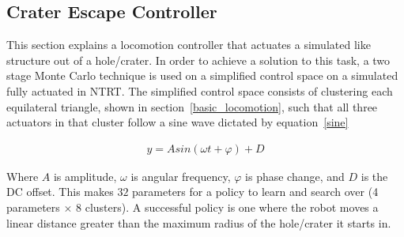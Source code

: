 
\subsection{Crater Escape Controller}
\label{sec:crater}
This section explains a locomotion controller that actuates a simulated \SB{} like structure out of a hole/crater.
In order to achieve a solution to this task, a two stage Monte Carlo technique is used on a simplified control space on a simulated fully actuated \SB{} in NTRT.
The simplified control space consists of clustering each equilateral triangle, shown in section~\ref{basic_locomotion}, such that all three actuators in that cluster follow a sine wave dictated by equation~\ref{sine}

\begin{align}
y = Asin(\omega t + \varphi) + D
\label{sine}
\end{align}

Where \(A\) is amplitude, \(\omega\) is angular frequency, \(\varphi\) is phase change, and \(D\) is the DC offset.
This makes \(32\) parameters for a policy to learn and search over (4 parameters $\times$ 8 clusters).
A successful policy is one where the robot moves a linear distance greater than the maximum radius of the hole/crater it starts in.

